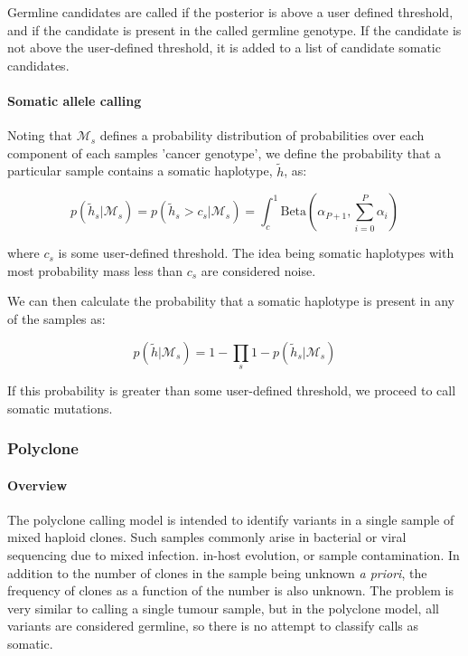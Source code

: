 \documentclass{article}
\begin{document}
Germline candidates are called if the posterior is above a user defined threshold, and if the candidate is present in the called germline genotype. If the candidate is not above the user-defined threshold, it is added to a list of candidate somatic candidates.

\paragraph{Somatic allele calling}

Noting that $\mathcal{M}_s$ defines a probability distribution of probabilities over each component of each samples 'cancer genotype', we define the probability that a particular sample contains a somatic haplotype, $\tilde{h}$, as:

\begin{equation}
\label{eq:somatic_probability_sample}
p(\tilde{h}_s | \mathcal{M}_s) = p(\tilde{h}_s > c_s | \mathcal{M}_s) = \int_c^1 \text{Beta}(\alpha_{P + 1}, \sum_{i = 0}^{P} \alpha_i)
\end{equation}

\noindent where $c_s$ is some user-defined threshold. The idea being somatic haplotypes with most probability mass less than $c_s$ are considered noise.

We can then calculate the probability that a somatic haplotype is present in any of the samples as:

\begin{equation}
\label{eq:somatic_probability}
p(\tilde{h} | \mathcal{M}_s) = 1 - \prod_s 1 - p(\tilde{h}_s | \mathcal{M}_s)
\end{equation}

\noindent If this probability is greater than some user-defined threshold, we proceed to call somatic mutations.

\subsubsection{Polyclone}

\paragraph{Overview}

The polyclone calling model is intended to identify variants in a single sample of mixed haploid clones. Such samples commonly arise in bacterial or viral sequencing due to mixed infection. in-host evolution, or sample contamination. In addition to the number of clones in the sample being unknown \textit{a priori}, the frequency of clones as a function of the number is also unknown. The problem is very similar to calling a single tumour sample, but in the polyclone model, all variants are considered germline, so there is no attempt to classify calls as somatic.
\end{document}
